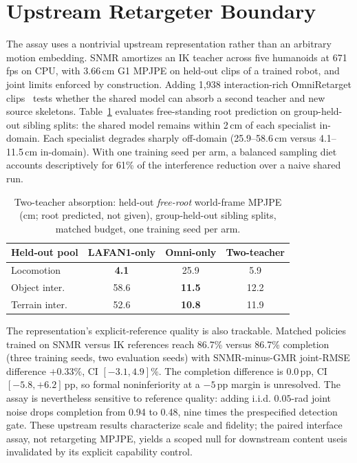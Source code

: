 \documentclass[conference]{IEEEtran}
\newif\ifeexplicitvalid
\newif\ifepositivecontent
\begin{document}
\section{Upstream Retargeter Boundary}
The assay uses a nontrivial upstream representation rather than an arbitrary motion
embedding.  SNMR amortizes an IK teacher across five humanoids at 671\,fps on CPU, with
3.66\,cm G1 MPJPE on held-out clips of a trained robot, and joint limits enforced by
construction.  Adding 1,938
interaction-rich OmniRetarget clips~\cite{omniretarget} tests whether the shared model
can absorb a second teacher and new source skeletons.  Table~\ref{tab:twoteacher}
evaluates free-standing root prediction on group-held-out sibling splits: the shared
model remains within 2\,cm of each specialist in-domain.  Each specialist degrades
sharply off-domain (25.9--58.6\,cm versus 4.1--11.5\,cm in-domain).  With one training seed per arm, a balanced sampling
diet accounts descriptively for 61\% of the interference reduction over a naive shared
run.

\begin{table}[t]
\centering
\caption{Two-teacher absorption: held-out \emph{free-root} world-frame MPJPE (cm;
root predicted, not given), group-held-out sibling splits, matched budget, one training
seed per arm.}
\label{tab:twoteacher}
\setlength{\tabcolsep}{4pt}
\begin{tabular}{lccc}
\toprule
Held-out pool & LAFAN1-only & Omni-only & Two-teacher \\
\midrule
Locomotion & \textbf{4.1} & 25.9 & 5.9 \\
Object inter. & 58.6 & \textbf{11.5} & 12.2 \\
Terrain inter. & 52.6 & \textbf{10.8} & 11.9 \\
\bottomrule
\end{tabular}
\end{table}

The representation's explicit-reference quality is also trackable.  Matched policies
trained on SNMR versus IK references reach 86.7\% versus 86.7\% completion (three
training seeds, two evaluation seeds) with SNMR-minus-GMR joint-RMSE difference
$+0.33\%$, CI $[-3.1,4.9]\%$.  The completion difference is 0.0\,pp, CI
$[-5.8,+6.2]$\,pp, so formal noninferiority at a $-5$\,pp margin is unresolved.  The
assay is nevertheless sensitive to reference quality:
adding i.i.d.
$0.05$-rad joint noise drops completion from 0.94 to 0.48, nine times the prespecified detection
gate.  These upstream results characterize scale and fidelity; the paired interface assay,
not retargeting MPJPE, \ifeexplicitvalid\ifepositivecontent establishes downstream
control-usable content\else yields a scoped null for downstream content use\fi\else is
invalidated by its explicit capability control\fi.
\end{document}
